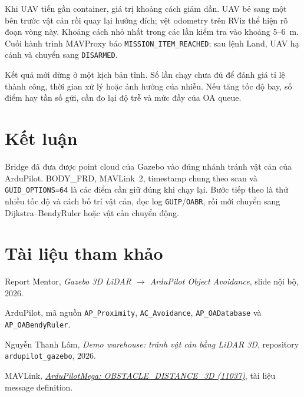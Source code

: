 \documentclass[11pt,a4paper]{article}
\begin{document}
Khi UAV tiến gần container, giá trị khoảng cách giảm dần. UAV bẻ sang một bên trước vật cản rồi quay lại hướng đích; vệt odometry trên RViz thể hiện rõ đoạn vòng này. Khoảng cách nhỏ nhất trong các lần kiểm tra vào khoảng 5--6~m. Cuối hành trình MAVProxy báo \texttt{MISSION\_ITEM\_REACHED}; sau lệnh Land, UAV hạ cánh và chuyển sang \texttt{DISARMED}.

Kết quả mới dừng ở một kịch bản tĩnh. Số lần chạy chưa đủ để đánh giá tỉ lệ thành công, thời gian xử lý hoặc ảnh hưởng của nhiễu. Nếu tăng tốc độ bay, số điểm hay tần số gửi, cần đo lại độ trễ và mức đầy của OA queue.

\section{Kết luận}

Bridge đã đưa được point cloud của Gazebo vào đúng nhánh tránh vật cản của ArduPilot. BODY\_FRD, MAVLink~2, timestamp chung theo scan và \texttt{GUID\_OPTIONS=64} là các điểm cần giữ đúng khi chạy lại. Bước tiếp theo là thử nhiều tốc độ và cách bố trí vật cản, đọc log \texttt{GUIP}/\texttt{OABR}, rồi mới chuyển sang Dijkstra--BendyRuler hoặc vật cản chuyển động.

\section*{Tài liệu tham khảo}
{\scriptsize
\noindent [1] Report Mentor, \emph{Gazebo 3D LiDAR $\rightarrow$ ArduPilot Object Avoidance}, slide nội bộ, 2026.\par
\noindent [2] ArduPilot, mã nguồn \texttt{AP\_Proximity}, \texttt{AC\_Avoidance}, \texttt{AP\_OADatabase} và \texttt{AP\_OABendyRuler}.\par
\noindent [3] Nguyễn Thanh Lâm, \emph{Demo warehouse: tránh vật cản bằng LiDAR 3D}, repository \texttt{ardupilot\_gazebo}, 2026.
\par\noindent [4] MAVLink, \href{https://mavlink.io/en/messages/ardupilotmega.html#OBSTACLE_DISTANCE_3D}{\emph{ArduPilotMega: OBSTACLE\_DISTANCE\_3D (11037)}}, tài liệu message definition.
}
\end{document}
